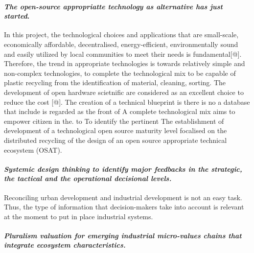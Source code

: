 \documentclass[
  11pt,
  a4paperpaper,
  onecolumn]{article}
\let\oldparagraph\paragraph
\renewcommand{\paragraph}[1]{\oldparagraph{#1}\mbox{}}
\let\paragraph\oldparagraph
\begin{document}
\hypertarget{the-open-source-appropriatte-technology-as-alternative-has-just-started.}{%
\paragraph{\texorpdfstring{\emph{The open-source appropriatte technology
as alternative has just
started}.}{The open-source appropriatte technology as alternative has just started.}}\label{the-open-source-appropriatte-technology-as-alternative-has-just-started.}}

In this project, the technological choices and applications that are
small-scale, economically affordable, decentralised, energy-efficient,
environmentally sound and easily utilized by local communities to meet
their needs is fundamental{[}@{]}. Therefore, the trend in appropriate
technologies is towards relatively simple and non-complex technologies,
to complete the technological mix to be capable of plastic recycling
from the identification of material, cleaning, sorting. The development
of open hardware scietnific are considered as an excellent choice to
reduce the cost {[}@{]}. The creation of a technical blueprint is there
is no a database that include is regarded as the front of A complete
technological mix aims to empower citizen in the. to To identify the
pertinent The establishment of development of a technological open
source maturity level focalised on the distributed recycling of the
design of an open source appropriate technical ecosystem (OSAT).

\hypertarget{systemic-design-thinking-to-identify-major-feedbacks-in-the-strategic-the-tactical-and-the-operational-decisional-levels.}{%
\paragraph{\texorpdfstring{\emph{Systemic design thinking to identify
major feedbacks in the strategic, the tactical and the operational
decisional
levels.}}{Systemic design thinking to identify major feedbacks in the strategic, the tactical and the operational decisional levels.}}\label{systemic-design-thinking-to-identify-major-feedbacks-in-the-strategic-the-tactical-and-the-operational-decisional-levels.}}

Reconciling urban development and industrial development is not an easy
task. Thus, the type of information that decision-makers take into
account is relevant at the moment to put in place industrial systems.

\hypertarget{pluralism-valuation-for-emerging-industrial-micro-values-chains-that-integrate-ecosystem-characteristics.}{%
\paragraph{\texorpdfstring{\emph{Pluralism valuation for emerging
industrial micro-values chains that integrate ecosystem
characteristics.}}{Pluralism valuation for emerging industrial micro-values chains that integrate ecosystem characteristics.}}\label{pluralism-valuation-for-emerging-industrial-micro-values-chains-that-integrate-ecosystem-characteristics.}}
\end{document}
